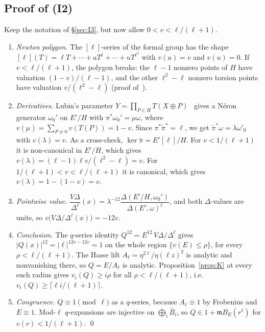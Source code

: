 \documentclass[11pt]{amsart}
\newcommand{\fm}{\mathfrak{m}}
\theoremstyle{plain}
\theoremstyle{definition}
\numberwithin{equation}{section}
\begin{document}
\subsection{Proof of (I2)}\label{sec:I2}
Keep the notation of \S\ref{sec:I3}, but now allow $0<v<\ell/(\ell+1)$.
\begin{enumerate}[label=(\arabic*)]
\item \emph{Newton polygon.} The $[\ell]$-series of the formal group has the shape
  $[\ell](T)=\ell T+\cdots+aT^\ell+\cdots+uT^{\ell^2}$ with $v(a)=v$ and $v(u)=0$. If $v<\ell/(\ell+1)$, the polygon
  breaks: the $\ell-1$ nonzero points of $H$ have valuation $(1-v)/(\ell-1)$, and the other $\ell^2-\ell$ nonzero torsion
  points have valuation $v/(\ell^2-\ell)$ (proof of~\cite[3.10.7]{Katz1973}).
\item \emph{Derivatives.} Lubin's parameter $Y=\prod_{P\in H}T(X\oplus P)$~\cite{Lubin1967} gives a N\'eron generator
  $\omega_0'$ on $E'/H$ with $\pi^*\omega_0'=\mu\omega$, where $v(\mu)=\sum_{P\ne0}v(T(P))=1-v$. Since
  $\pi^*\check\pi^*=\ell$, we get $\check\pi^*\omega=\lambda\omega'_0$ with $v(\lambda)=v$.
  As a cross-check, $\ker\check\pi=E'[\ell]/H$. For $v<1/(\ell+1)$ it is non-canonical in $E'/H$, which gives
  $v(\lambda)=(\ell-1)\ell v/(\ell^2-\ell)=v$. For $1/(\ell+1)<v<\ell/(\ell+1)$ it is canonical, which gives
  $v(\lambda)=1-(1-v)=v$.
\item \emph{Pointwise value.} $\dfrac{V\Delta}{\Delta^\ell}(x)=\lambda^{-12}\dfrac{\Delta(E'/H,\omega_0')}{\Delta(E',\omega)^\ell}$,
  and both $\Delta$-values are units, so $v\big(V\Delta/\Delta^\ell(x)\big)=-12v$.
\item \emph{Conclusion.} The $q$-series identity $Q^{12}=E^{12}\,V\Delta/\Delta^\ell$ gives $|Q(x)|^{12}=|\ell|^{12v-12v}=1$
  on the whole region $\{v(E)\le\rho\}$, for every $\rho<\ell/(\ell+1)$. The Hasse lift $A_\ell=\eta^{2\ell}/\eta(\ell z)^2$ is
  analytic and nonvanishing there, so $Q=E/A_\ell$ is analytic. Proposition~\ref{prop:K} at every such radius gives
  $v_i(Q)\ge i\rho$ for all $\rho<\ell/(\ell+1)$, i.e.\ $v_i(Q)\ge\lceil\ell i/(\ell+1)\rceil$.
\item \emph{Congruence.} $Q\equiv1\pmod\ell$ as a $q$-series, because $A_\ell\equiv1$ by Frobenius and $E\equiv1$. Mod-$\ell$
  $q$-expansions are injective on $\bigoplus_i\bar B_i$, so $Q\in1+\fm B_E(r^\ell)$ for $v(r)<1/(\ell+1)$. \qed
\end{enumerate}
\end{document}
